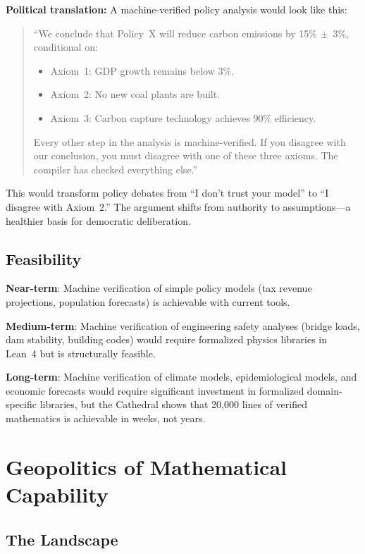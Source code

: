 \documentclass[11pt,a4paper]{article}
\begin{document}
\textbf{Political translation:} A machine-verified policy analysis
would look like this:

\begin{quote}
``We conclude that Policy~X will reduce carbon emissions by 15\%
$\pm$~3\%, conditional on:
\begin{itemize}
  \item Axiom~1: GDP growth remains below 3\%.
  \item Axiom~2: No new coal plants are built.
  \item Axiom~3: Carbon capture technology achieves 90\% efficiency.
\end{itemize}
Every other step in the analysis is machine-verified. If you
disagree with our conclusion, you must disagree with one of these
three axioms. The compiler has checked everything else.''
\end{quote}

This would transform policy debates from ``I don't trust your model''
to ``I disagree with Axiom~2.'' The argument shifts from authority
to assumptions---a healthier basis for democratic deliberation.

\subsection{Feasibility}

\textbf{Near-term}: Machine verification of simple policy models
(tax revenue projections, population forecasts) is achievable with
current tools.

\textbf{Medium-term}: Machine verification of engineering safety
analyses (bridge loads, dam stability, building codes) would require
formalized physics libraries in Lean~4 but is structurally feasible.

\textbf{Long-term}: Machine verification of climate models,
epidemiological models, and economic forecasts would require
significant investment in formalized domain-specific libraries, but
the Cathedral shows that 20,000 lines of verified mathematics
is achievable in weeks, not years.

\section{Geopolitics of Mathematical Capability}
\label{sec:geopolitics}

\subsection{The Landscape}
\end{document}
